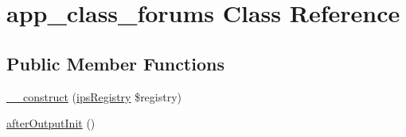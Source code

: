 \hypertarget{classapp__class__forums}{\section{app\-\_\-class\-\_\-forums Class Reference}
\label{classapp__class__forums}
}
\subsection*{Public Member Functions}
\begin{DoxyCompactItemize}
\item 
\hyperlink{classapp__class__forums_a178c3a93e57e75dd87a5d39112af0b07}{\-\_\-\-\_\-construct} (\hyperlink{classips_registry}{ips\-Registry} \$registry)
\item 
\hyperlink{classapp__class__forums_a60d8084dfb6a94ba9b3c50d47e51b258}{after\-Output\-Init} ()
\end{DoxyCompactItemize}
